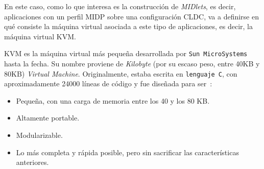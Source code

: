 En este caso, como lo que interesa es la construcción de \emph{MIDlets}, es
decir, aplicaciones con un perfil \acs{MIDP} sobre una configuración
\acs{CLDC}, va a definirse en qué consiste la máquina virtual asociada a
este tipo de aplicaciones, es decir, la máquina virtual \acs{KVM}.

\acs{KVM} es la máquina virtual más pequeña desarrollada por \texttt{Sun
MicroSystems} hasta la fecha. Su nombre proviene de \emph{Kilobyte} (por su 
escaso peso, entre 40KB y 80KB) \emph{Virtual Machine}. Originalmente, estaba 
escrita en \texttt{lenguaje C}, con aproximadamente 24000 líneas de código y 
fue diseñada para ser~\cite{bib:j2me}:
\begin{itemize}
\item Pequeña, con una carga de memoria entre los 40 y los 80 KB.
\item Altamente portable.
\item Modularizable.
\item Lo más completa y rápida posible, pero sin sacrificar las características
anteriores.
\end{itemize}

